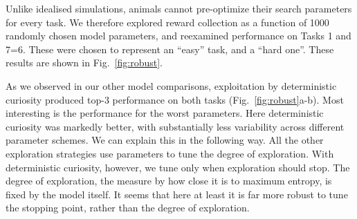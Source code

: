 Unlike idealised simulations, animals cannot pre-optimize their search parameters for every task. We therefore explored reward collection as a function of 1000 randomly chosen model parameters, and reexamined performance on Tasks 1 and 7=6. These were chosen to represent an ``easy'' task, and a ``hard one''. These results are shown in Fig.~\ref{fig:robust}. 

As we observed in our other model comparisons, exploitation by deterministic curiosity produced top-3 performance on both tasks (Fig.~\ref{fig:robust}a-b). Most interesting is the performance for the worst parameters. Here deterministic curiosity was markedly better, with substantially less variability across different parameter schemes. We can explain this in the following way. All the other exploration strategies use parameters to tune the degree of exploration. With deterministic curiosity, however, we tune only when exploration should stop. The degree of exploration, the measure by how close it is to maximum entropy, is fixed by the model itself. It seems that here at least it is far more robust to tune the stopping point, rather than the degree of exploration.

